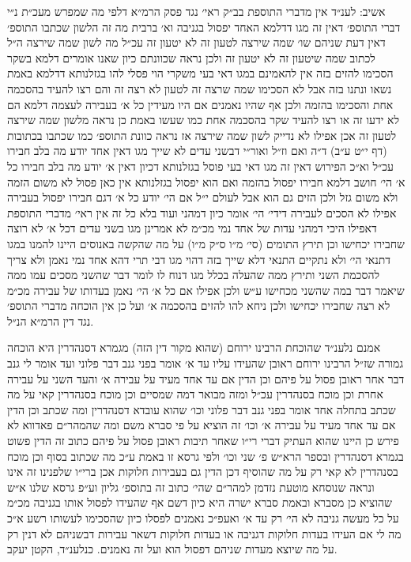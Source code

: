 \documentclass[12pt, openany]{book}
\begin{document}
\begin{multicols}{2}
אשיב: לענ״ד אין מדברי התוספת בב״ק ראי׳ נגד פסק הרמ״א דלפי מה שמפרש מעכ״ת נ״י דברי התוספ׳ דאין זה מגו דדלמא האחד יפסול בגניבה וא׳ ברבית מה זה הלשון שכתבו התוספ׳ דאין דעת שניהם שו׳ שמה שירצה לטעון זה לא יטעון זה עכ״ל מה לשון שמה שירצה ה״ל לכתוב שמה שיטעון זה לא יטעון זה ולכן נראה שכוונתם כיון שאנו אומרים דלמא בשקר הסכימו להזים בזה אין להאמינם במגו דאי בעי משקרי הוי פסלי להו בגזלנותא דדלמא באמת נשאו ונתנו בזה אבל לא הסכימו שמה שרצה זה לטעון לא רצה זה והם רצו להעיד בהסכמה אחת והסכימו בהזמה ולכן אף שהיו נאמנים אם היו מעידין כל א׳ בעבירה לעצמה דלמא הם לא ידעו זה או רצו להעיד שקר בהסכמה אחת כמו שעשו באמת כן נראה מלשון שמה שירצה לטעון זה אכן אפילו לא נדייק לשון שמה שירצה אז נראה כוונת התוספ׳ כמו שכתבו בכתובות (דף י״ט ע״ב) ד״ה ואם וז״ל ואור״י דבשני עדים לא שייך מגו דאין אחד יודע מה בלב חבירו עכ״ל וא״כ הפירוש דאין זה מגו דאי בעי פוסל בגזלנותא דכיון דאין א׳ יודע מה בלב חבירו כל א׳ הי׳ חושב דלמא חבירו יפסול בהזמה ואם הוא יפסול בגזלנותא אין כאן פסול לא משום הזמה ולא משום גזל ולכן הזים גם הוא אבל לעולם י״ל אם הי׳ יודע כל א׳ דגם חבירו יפסול בעבירה אפילו לא הסכים לעבירה דידי׳ הי׳ אומר כיון דמהני ועוד בלא כל זה אין ראי׳ מדברי התוספת דאפילו היכי דמהני עדות של אחד נמי מכ״מ לא אמרינן מגו בשני עדים דכל א׳ לא רוצה שחבירו יכחישו וכן תירץ התומים (סי׳ מ״ו ס״ק מ״ו) על מה שהקשה באנוסים היינו להמנו במגו דתנאי הי׳ ולא נתקיים התנאי דלא שייך בזה דהוי מגו דבי תרי דהא אחד נמי נאמן ולא צריך להסכמת השני ותירץ ממה שהעלה בכלל מגו דנוח לו לומר דבר שהשני מסכים עמו ממה שיאמר דבר במה שהשני מכחישו ע״ש ולכן אפילו אם כל א׳ הי׳ נאמן בעדותו של עבירה מכ״מ לא רצה שחבירו יכחישו ולכן ניחא להו להזים בהסכמה א׳ ועל כן אין הוכחה מדברי התוספ׳ נגד דין הרמ״א הנ״ל.\\\vspace{0pt}

אמנם נלענ״ד שהוכחת הרבינו ירוחם (שהוא מקור דין הזה) מגמרא דסנהדרין היא הוכחה גמורה שז״ל הרבינו ירוחם ראובן שהעידו עליו עד א׳ אומר בפני גנב דבר פלוני ועד אומר לי גנב דבר אחר ראובן פסול על פיהם וכן הדין אם עד אחד מעיד על עבירה א׳ והעד השני על עבירה אחרת וכן מוכח בסנהדרין עכ״ל ומזה מבואר דמה שמסיים וכן מוכח בסנהדרין קאי על מה שכתב בתחלה אחד אומר בפני גנב דבר פלוני וכו׳ שהוא עובדא דסנהדרין ומה שכתב וכן הדין אם עד אחד מעיד על עבירה א׳ וכו׳ זה הוציא על פי סברא משם ומה שהמהר״ם פאדווא לא פירש כן היינו שהוא העתיק דברי רי״ו שאחר תיבות ראובן פסול על פיהם כתוב זה הדין פשוט בגמרא דסנהדרין ובספר הרא״ש פ׳ שני וכו׳ ולפי גרסא זו באמת ע״כ מה שכתוב בסוף וכן מוכח בסנהדרין לא קאי רק על מה שהוסיף דכן הדין גם בעבירות חלוקות אכן ברי״ו שלפנינו זה אינו ונראה שנוסחא מוטעת נזדמן למהר״ם שהי׳ כתוב זה בתוספ׳ גליון וע״פ גרסא שלנו א״ש שהוציא כן מסברא ובאמת סברא ישרה היא כיון דשם אף שהעידו לפסול אותו בגניבה מכ״מ על כל מעשה גניבה לא הי׳ רק עד א׳ ואעפ״כ נאמנים לפסלו כיון שהסכימו לעשותו רשע א״כ מה לי אם העידו בעדות חלוקות דגניבה או בעדות חלוקות דשאר עבירות דבשניהם לא דנין רק על מה שיוצא מעדות שניהם דפסול הוא ועל זה נאמנים. כנלענ״ד, הקטן יעקב.\\\vspace{0pt}

\end{multicols}\newpage
\end{document}
